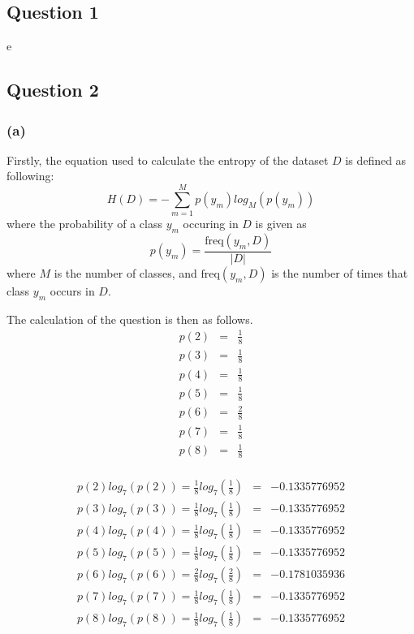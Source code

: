 \documentclass[10pt]{article}
\begin{document}
\subsection*{Question 1}

e

\subsection*{Question 2}

\subsubsection*{(a)}

Firstly, the equation used to calculate the entropy of the dataset $D$ is defined as following:
\begin{equation*}
    H(D) = - \sum_{m=1}^{M} p(y_m)log_M \left( p(y_m) \right)
\end{equation*}
where the probability of a class $y_m$ occuring in $D$ is given as
\begin{equation*}
    p(y_m) = \frac{\text{freq}(y_m, D)}{|D|}
\end{equation*}
where $M$ is the number of classes, and $\text{freq}(y_m, D)$ is the number of times that class $y_m$
occurs in $D$.

The calculation of the question is then as follows.
\begin{eqnarray*}
    p(2) &=& \frac{1}{8} \\
    p(3) &=& \frac{1}{8} \\
    p(4) &=& \frac{1}{8} \\
    p(5) &=& \frac{1}{8} \\
    p(6) &=& \frac{2}{8} \\
    p(7) &=& \frac{1}{8} \\
    p(8) &=& \frac{1}{8} \\
\end{eqnarray*}

\begin{eqnarray*}
    p(2) log_7 \left( p(2) \right) = \frac{1}{8} log_7 \left( \frac{1}{8} \right) &=& -0.1335776952\\
    p(3) log_7 \left( p(3) \right) = \frac{1}{8} log_7 \left( \frac{1}{8} \right) &=& -0.1335776952\\
    p(4) log_7 \left( p(4) \right) = \frac{1}{8} log_7 \left( \frac{1}{8} \right) &=& -0.1335776952\\
    p(5) log_7 \left( p(5) \right) = \frac{1}{8} log_7 \left( \frac{1}{8} \right) &=& -0.1335776952\\
    p(6) log_7 \left( p(6) \right) = \frac{2}{8} log_7 \left( \frac{2}{8} \right) &=& -0.1781035936\\
    p(7) log_7 \left( p(7) \right) = \frac{1}{8} log_7 \left( \frac{1}{8} \right) &=& -0.1335776952\\
    p(8) log_7 \left( p(8) \right) = \frac{1}{8} log_7 \left( \frac{1}{8} \right) &=& -0.1335776952\\
\end{eqnarray*}
\end{document}

